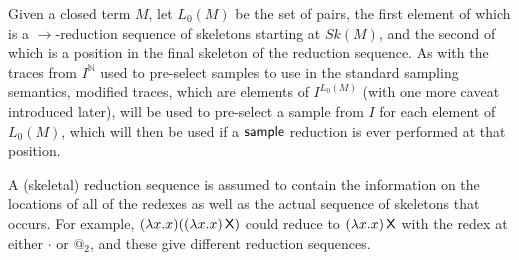 Given a closed term $M$, let $L_0(M)$ be the set of pairs, the first element of which is a $\to$-reduction sequence of skeletons starting at $\mathit{Sk}(M)$, and the second of which is a position in the final skeleton of the reduction sequence. 
As with the traces from $I^{\mathbb N}$ used to pre-select samples to use in the standard sampling semantics, modified traces, which are elements of $I^{L_0(M)}$ (with one more caveat introduced later), will be used to pre-select a sample from $I$ for each element of $L_0(M)$, which will then be used if a $\mathsf{sample}$ reduction is ever performed at that position.


A (skeletal) reduction sequence is assumed to contain the information on the locations of all of the redexes as well as the actual sequence of skeletons that occurs. For example, $(\lambda x. x) ((\lambda x. x) \, \mathsf{X})$ could reduce to $(\lambda x. x) \, \mathsf{X}$ with the redex at either $\cdot$ or $@_2$, and these give different reduction sequences.

